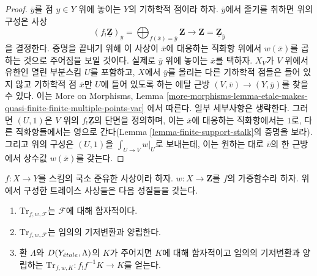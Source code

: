 \begin{proof}
\medskip\noindent
$\overline{y}$를 점 $y \in Y$ 위에 놓이는 $Y$의 기하학적 점이라 하자.
$\overline{y}$에서 줄기를 취하면 위의 구성은 사상
$$
(f_!\underline{\mathbf{Z}})_{\overline{y}}
= \bigoplus\nolimits_{f(\overline{x}) = \overline{y}} \mathbf{Z}
\longrightarrow
\mathbf{Z} = \underline{\mathbf{Z}}_{\overline{y}}
$$
을 결정한다. 증명을 끝내기 위해 이 사상이 $\overline{x}$에 대응하는
직화항 위에서 $w(\overline{x})$를 곱하는 것으로 주어짐을 보일 것이다.
실제로 $\overline{y}$ 위에 놓이는 $\overline{x}$를 택하자.
$X_V$가 $V$ 위에서 유한인 열린 부분스킴 $U$를 포함하고,
$X$에서 $\overline{y}$를 올리는 다른 기하학적 점들은 들어 있지 않고
기하학적 점 $\overline{x}$만 $U$에 들어 있도록 하는 에탈 근방
$(V, \overline{v}) \to (Y, \overline{y})$를 찾을 수 있다.
이는 More on Morphisms, Lemma
\ref{more-morphisms-lemma-etale-makes-quasi-finite-finite-multiple-points-var}
에서 따른다. 일부 세부사항은 생략한다. 그러면 $(U, 1)$은 $V$ 위의
$f_!\underline{\mathbf{Z}}$의 단면을 정의하며, 이는
$\overline{x}$에 대응하는 직화항에서는 $1$로, 다른 직화항들에서는
영으로 간다(Lemma \ref{lemma-finite-support-stalk}의 증명을 보라).
그리고 위의 구성은 $(U, 1)$을 $\int_{U \to V} w|_U$로 보내는데,
이는 원하는 대로 $\overline{v}$의 한 근방에서 상수값
$w(\overline{x})$를 갖는다.
\end{proof}

\begin{lemma}
\label{lemma-properties-trace-map}
$f : X \to Y$를 스킴의 국소 준유한 사상이라 하자.
$w : X \to \mathbf{Z}$를 $f$의 가중함수라 하자. 위에서 구성한
트레이스 사상들은 다음 성질들을 갖는다.
\begin{enumerate}
\item $\text{Tr}_{f, w, \mathcal{F}}$는 $\mathcal{F}$에 대해 함자적이다.
\item $\text{Tr}_{f, w, \mathcal{F}}$는 임의의 기저변환과 양립한다.
\item 환 $\Lambda$와 $D(Y_{\acute{e}tale}, \Lambda)$의 $K$가 주어지면
$K$에 대해 함자적이고 임의의 기저변환과 양립하는
$\text{Tr}_{f, w, K} : f_!f^{-1}K \to K$를 얻는다.
\end{enumerate}
\end{lemma}

